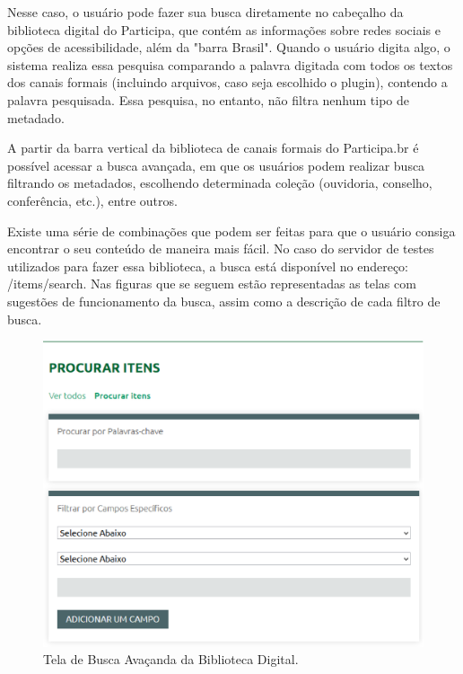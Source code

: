 Nesse caso, o usuário pode fazer sua busca diretamente no cabeçalho da biblioteca digital do Participa, que contém as informações sobre redes sociais e opções de acessibilidade, além da "barra Brasil". Quando o usuário digita algo, o sistema realiza essa pesquisa comparando a palavra digitada com todos os textos dos canais formais (incluindo arquivos, caso seja escolhido o plugin), contendo a palavra pesquisada. Essa pesquisa, no entanto, não filtra nenhum tipo de metadado. 

A partir da barra vertical da biblioteca de canais formais do Participa.br é possível acessar a busca avançada, em que os usuários podem realizar busca filtrando os metadados, escolhendo determinada coleção (ouvidoria, conselho, conferência, etc.), entre outros.

Existe uma série de combinações que podem ser feitas para que o usuário consiga encontrar o seu conteúdo de maneira mais fácil. No caso do servidor de testes utilizados para fazer essa biblioteca, a busca está disponível no endereço: /items/search. Nas figuras que se seguem estão representadas as telas com sugestões de funcionamento da busca, assim como a descrição de cada filtro de busca.

\graphicspath{{figuras/prototipo/}}
\begin{figure}[H]
\centering
\includegraphics[width=1.0\textwidth]{tela-busca}
\caption{Tela de Busca Avaçanda da Biblioteca Digital.}
\label{fig:buscaavancada_prototipo}
\end{figure}

